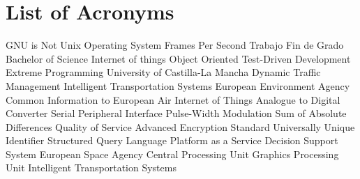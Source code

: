 \chapter{List of Acronyms} %

{\small
\begin{acronym}[XXXXXXXX]
	     	{\acs{GNU} is Not Unix}
			{Operating System}
			{Frames Per Second}
			{Trabajo Fin de Grado}
			{Bachelor of Science}
			{Internet of things}
			{Object Oriented}
			{Test-Driven Development}
			{Extreme Programming}
			{University of Castilla-La Mancha}
			{Dynamic Traffic Management}
			{Intelligent Transportation Systems}
			{European Environment Agency}
		{Common Information to European Air}
	 		{Internet of Things}
			{Analogue to Digital Converter}
			{Serial Peripheral Interface}
			{Pulse-Width Modulation}
			{Sum of Absolute Differences}
			{Quality of Service}
			{Advanced Encryption Standard}
			{Universally Unique Identifier}
			{Structured Query Language}
			{Platform as a Service}
			{Decision Support System}
			{European Space Agency}
			{Central Processing Unit}
			{Graphics Processing Unit}
			{Intelligent Transportation Systems}
\end{acronym}
}





